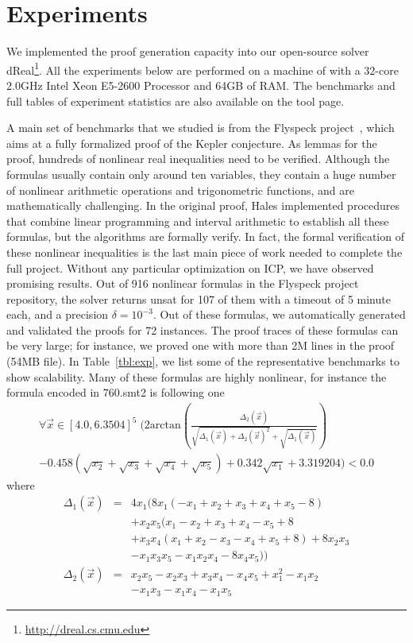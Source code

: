 \section{Experiments}\label{kepler}
We implemented the proof generation capacity into our open-source solver {\sf
  dReal}\footnote{\url{http://dreal.cs.cmu.edu} }. All the experiments below are performed on a machine of with a 32-core 2.0GHz Intel
Xeon E5-2600 Processor and 64GB of RAM. The benchmarks and full tables of experiment statistics are also available on the tool page. 



A main set of benchmarks that we studied is from the Flyspeck project~\cite{DBLP:conf/dagstuhl/Hales05,DBLP:conf/nfm/SolovyevH13}, which aims at a 
fully formalized proof of the Kepler conjecture. As lemmas for the
proof, hundreds of nonlinear real inequalities need to be verified.
Although the formulas usually contain only around ten variables, they
contain a huge number of nonlinear arithmetic operations and
trigonometric functions, and are mathematically challenging. In the original proof, Hales implemented procedures that combine
linear programming and interval arithmetic to establish all these
formulas, but the algorithms are formally verify. In
fact, the formal verification of these nonlinear inequalities is the last main piece
of work needed to complete the full project. 
Without any particular optimization on ICP, we have observed
promising results. Out of 916 nonlinear formulas in the Flyspeck
project repository, the solver returns {\sf unsat} for 107 of them with a timeout of 5 minute each, and a precision $\delta=10^{-3}$. Out of these formulas, we automatically generated and validated the proofs for 72 instances. The proof traces of these formulas can be very
large; for instance, we proved one with more than 2M lines in the
proof (54MB file). In Table~\ref{tbl:exp}, we list some of the
representative benchmarks to show scalability. Many of these formulas are highly nonlinear, for instance the formula encoded in 760.smt2 is following one 
\begin{multline*}
\forall\vec{x} \in [4.0, 6.3504]^5\; \Big(2\mathrm{arctan} (\frac{\Delta_2(\vec x)}{\sqrt{\Delta_1(\vec x) + \Delta_2(\vec x)^2} + \sqrt{\Delta_1(\vec x)}})\\
- 0.458(\sqrt{x_2} + \sqrt{x_3} +\sqrt{x_4} + \sqrt{x_5}) + 0.342\sqrt{x_1} + 3.319204\Big) < 0.0
\end{multline*}
where
\begin{eqnarray*}
  \Delta_1(\vec{x}) &=& 4x_1 (8x_1 (-x_1 + x_2 + x_3 + x_4 + x_5 - 8)\\
   & &+ x_2 x_5 (x_1 - x_2 + x_3 + x_4 - x_5+8\\%
& &+ x_3x_4(x_1 + x_2 - x_3 - x_4 + x_5 + 8)+ 8 x_2 x_3 \\
& &- x_1 x_3 x_5 - x_1  x_2  x_4 - 8 x_4 x_5))\\
\Delta_2(\vec{x}) &=& x_2 x_5 -x_2 x_3 + x_3x_4 - x_4 x_5 +x_1^2 -x_1x_2\\
& & - x_1x_3 - x_1x_4 -x_1 x_5
\end{eqnarray*}

